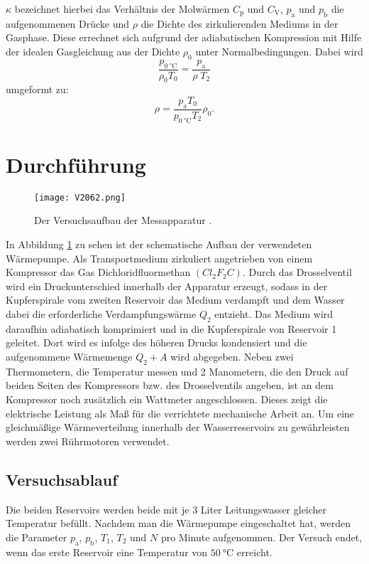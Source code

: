 \documentclass[
  bibliography=totoc,     %
  captions=tableheading,  %
  titlepage=firstiscover, %
]{scrartcl}
\begin{document}
$\kappa$ bezeichnet hierbei das Verhältnis der Molwärmen $C_{\mathup{p}}$ und
$C_{\mathup{V}}$, $p_{\mathup{a}}$ und $p_{\mathup{b}}$ die aufgenommenen Drücke
und $\rho$ die Dichte des zirkulierenden Mediums in der Gasphase. Diese errechnet
sich aufgrund der adiabatischen Kompression mit Hilfe der idealen Gasgleichung
aus der Dichte $\rho_0$ unter Normalbedingungen. Dabei wird
\begin{equation}
    \frac{p_{\SI{0}{\celsius}}}{ρ_0T_0}=\frac{p_{\mathup{a}}}{ρ\;T_{\mathup{2}}}
\end{equation}
umgeformt zu:
\begin{equation}
    ρ=\frac{p_{\mathup{a}}T_0}{p_{\SI{0}{\celsius}}T_{\mathup{2}}}ρ_0.
	\label{eqn:dichte}
\end{equation}
\section{Durchführung}
\label{sec:durchführung}
\begin{figure}[htb]
  \centering
  \texttt{[image: V2062.png]}
  \caption{Der Versuchsaufbau der Messapparatur \cite{anleitung}.}
  \label{fig:V2062}
\end{figure}
In Abbildung \ref{fig:V2062} zu sehen ist der schematische Aufbau der
verwendeten Wärmepumpe. Als Transportmedium zirkuliert angetrieben von einem
Kompressor das Gas Dichloridfluormethan $(Cl_2F_2C)$. Durch das Drosselventil
wird ein Druckunterschied innerhalb der Apparatur erzeugt, sodass in der
Kupferspirale vom zweiten Reservoir das Medium verdampft und dem Wasser dabei die
erforderliche Verdampfungswärme $Q_2$ entzieht. Das Medium wird daraufhin
adiabatisch komprimiert und in die Kupferspirale von Reservoir 1 geleitet.
Dort wird es infolge des höheren Drucks kondensiert und die aufgenommene Wärmemenge
$Q_2+A$ wird abgegeben. Neben zwei Thermometern, die Temperatur messen und 2
Manometern, die den Druck auf beiden Seiten des Kompressors bzw. des
Drosselventils angeben, ist an dem Kompressor noch zusätzlich ein Wattmeter
angeschlossen. Dieses zeigt die elektrische Leistung als Maß für die verrichtete
mechanische Arbeit an. Um eine gleichmäßige Wärmeverteilung innerhalb der
Wasserreservoirs zu gewährleisten werden zwei Rührmotoren verwendet.

\subsection{Versuchsablauf}
\label{sub:versuchsablauf}
Die beiden Reservoirs werden beide mit je 3 Liter Leitungswasser
gleicher Temperatur befüllt. Nachdem man die Wärmepumpe eingeschaltet hat, werden
die Parameter $p_{\mathup{a}}$, $p_{\mathup{b}}$, $T_1$, $T_2$ und $N$ pro Minute
aufgenommen. Der Versuch endet, wenn das erste Reservoir eine Temperatur von
$\SI{50}{\celsius}$ erreicht.
\clearpage
\end{document}
